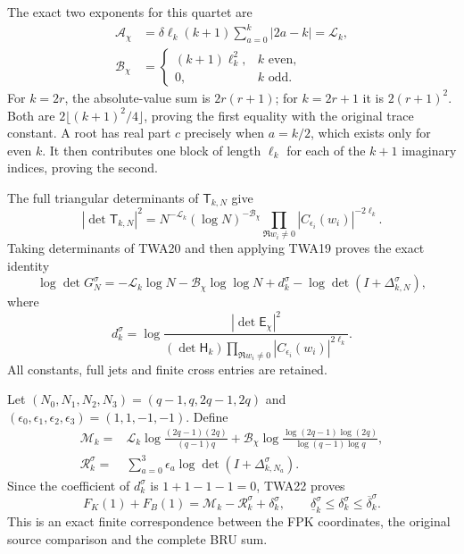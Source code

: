 The exact two exponents for this quartet are
\[
\begin{aligned}
\mathcal A_\chi
 &=\delta\ell_k(k+1)\sum_{a=0}^k|2a-k|
 =\mathcal L_k,\\
\mathcal B_\chi
 &=\begin{cases}(k+1)\ell_k^2,&k\text{ even},\\0,&k\text{ odd}.
\end{cases}
\end{aligned}\tag{TWA21}
\]
For $k=2r$, the absolute-value sum is $2r(r+1)$; for $k=2r+1$
it is $2(r+1)^2$. Both are $2\lfloor(k+1)^2/4\rfloor$,
proving the first equality with the original trace constant.
A root has real part $c$ precisely when $a=k/2$, which exists
only for even $k$. It then contributes one block of length
$\ell_k$ for each of the $k+1$ imaginary indices, proving the second.

The full triangular determinants of $\mathsf T_{k,N}$ give
\[
|\det\mathsf T_{k,N}|^2
=N^{-\mathcal L_k}(\log N)^{-\mathcal B_\chi}
 \prod_{\Re w_i\ne0}|C_{\epsilon_i}(w_i)|^{-2\ell_k}.
\]
Taking determinants of TWA20 and then applying TWA19 proves
the exact identity
\[
\log\det G_N^\sigma
=-\mathcal L_k\log N-\mathcal B_\chi\log\log N
 +d_k^\sigma-\log\det(I+\Delta_{k,N}^\sigma),
\tag{TWA22}
\]
where
\[
d_k^\sigma=\log\frac{|\det\mathsf E_\chi|^2}
{(\det\mathsf H_k)
 \prod_{\Re w_i\ne0}|C_{\epsilon_i}(w_i)|^{2\ell_k}}.
\]
All constants, full jets and finite cross entries are retained.

Let $(N_0,N_1,N_2,N_3)=(q-1,q,2q-1,2q)$ and
$(\epsilon_0,\epsilon_1,\epsilon_2,\epsilon_3)=(1,1,-1,-1)$.
Define
\[
\begin{aligned}
\mathcal M_k={}&\mathcal L_k
 \log\frac{(2q-1)(2q)}{(q-1)q}
 +\mathcal B_\chi
 \log\frac{\log(2q-1)\log(2q)}{\log(q-1)\log q},\\
\mathcal R_k^\sigma={}&\sum_{a=0}^3\epsilon_a
                         \log\det(I+\Delta_{k,N_a}^\sigma).
\end{aligned}
\]
Since the coefficient of $d_k^\sigma$ is $1+1-1-1=0$,
TWA22 proves
\[
\boxed{F_K(1)+F_B(1)
=\mathcal M_k-\mathcal R_k^\sigma+\delta_k^\sigma,
\qquad
\underline\delta_k^\sigma\leq\delta_k^\sigma
                         \leq\overline\delta_k^\sigma.}
\tag{TWA23}
\]
This is an exact finite correspondence between the FPK coordinates,
the original source comparison and the complete BRU sum.

